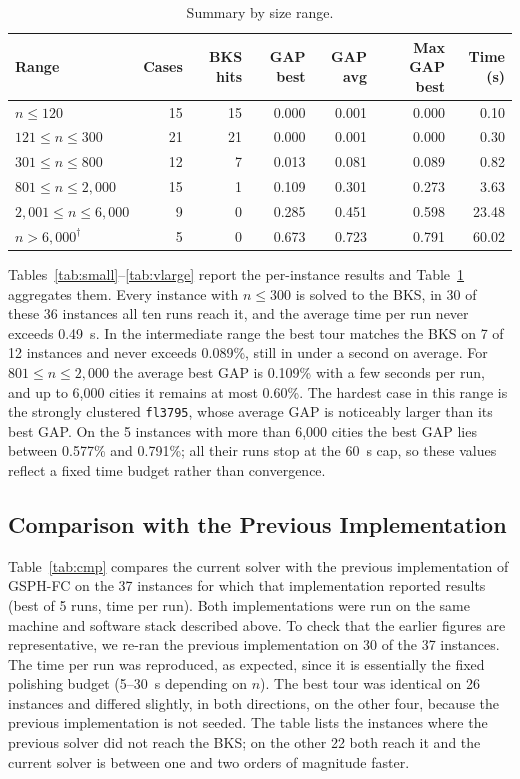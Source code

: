 \documentclass[runningheads]{llncs}
\begin{document}
\begin{table}
\caption{Summary by size range.}
\label{tab:summary}
\centering\small
\begin{tabular}{@{}lrrrrrr@{}}
\toprule
\textbf{Range} & \textbf{Cases} & \textbf{BKS hits} & \textbf{GAP best} & \textbf{GAP avg} & \textbf{Max GAP best} & \textbf{Time (s)}\\
\midrule
$n\le 120$ & 15 & 15 & 0.000 & 0.001 & 0.000 & 0.10 \\
$121\le n\le 300$ & 21 & 21 & 0.000 & 0.001 & 0.000 & 0.30 \\
$301\le n\le 800$ & 12 & 7 & 0.013 & 0.081 & 0.089 & 0.82 \\
$801\le n\le 2{,}000$ & 15 & 1 & 0.109 & 0.301 & 0.273 & 3.63 \\
$2{,}001\le n\le 6{,}000$ & 9 & 0 & 0.285 & 0.451 & 0.598 & 23.48 \\
$n>6{,}000^{\dagger}$ & 5 & 0 & 0.673 & 0.723 & 0.791 & 60.02 \\
\bottomrule
\end{tabular}
\end{table}

Tables~\ref{tab:small}--\ref{tab:vlarge} report the per-instance
results and Table~\ref{tab:summary} aggregates them. Every instance
with $n\le 300$ is solved to the BKS, in 30 of these
36 instances all ten runs reach it, and the average time per
run never exceeds 0.49~s. In the intermediate range
the best tour matches the BKS on 7 of 12
instances and never exceeds 0.089\%, still in under a second
on average. For $801\le n\le 2{,}000$ the average best GAP is
0.109\% with a few seconds per run, and up to 6{,}000 cities it
remains at most 0.60\%. The hardest case in this range is
the strongly clustered \texttt{fl3795}, whose average GAP is noticeably
larger than its best GAP. On the 5 instances with more than 6{,}000 cities the best GAP lies between 0.577\% and 0.791\%; all their runs stop at the 60~s cap, so these values reflect a fixed time budget rather than convergence.

\subsection{Comparison with the Previous Implementation}

Table~\ref{tab:cmp} compares the current solver with the previous
implementation of GSPH-FC on the 37 instances for which that
implementation reported results (best of 5 runs, time per run). Both
implementations were run on the same machine and software stack
described above. To check that the earlier figures are representative,
we re-ran the previous implementation on 30 of the 37 instances. The
time per run was reproduced, as expected, since it is essentially the
fixed polishing budget (5--30~s depending on $n$). The best tour was
identical on 26 instances and differed slightly, in both directions, on
the other four, because the previous implementation is not seeded. The
table lists the instances where the previous solver did not reach the
BKS; on the other 22 both reach it and the current
solver is between one and two orders of magnitude faster.
\end{document}
